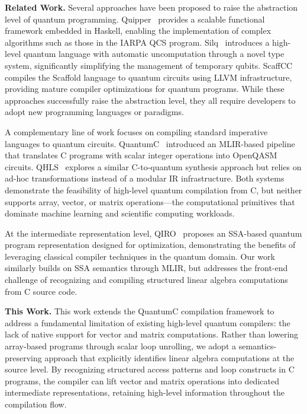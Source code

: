 \textbf{Related Work.}
Several approaches have been proposed to raise the abstraction level of quantum programming. Quipper~\cite{quipper} provides a scalable functional framework embedded in Haskell, enabling the implementation of complex algorithms such as those in the IARPA QCS program. Silq~\cite{silq} introduces a high-level quantum language with automatic uncomputation through a novel type system, significantly simplifying the management of temporary qubits. ScaffCC~\cite{scaffcc} compiles the Scaffold language to quantum circuits using LLVM infrastructure, providing mature compiler optimizations for quantum programs. While these approaches successfully raise the abstraction level, they all require developers to adopt new programming languages or paradigms.

A complementary line of work focuses on compiling standard imperative languages to quantum circuits. QuantumC~\cite{quantumc} introduced an MLIR-based pipeline that translates C programs with scalar integer operations into OpenQASM circuits. QHLS~\cite{qhls} explores a similar C-to-quantum synthesis approach but relies on ad-hoc transformations instead of a modular IR infrastructure. Both systems demonstrate the feasibility of high-level quantum compilation from C, but neither supports array, vector, or matrix operations---the computational primitives that dominate machine learning and scientific computing workloads.

At the intermediate representation level, QIRO~\cite{qiro} proposes an SSA-based quantum program representation designed for optimization, demonstrating the benefits of leveraging classical compiler techniques in the quantum domain. Our work similarly builds on SSA semantics through MLIR, but addresses the front-end challenge of recognizing and compiling structured linear algebra computations from C source code.

\textbf{This Work.} This work extends the QuantumC compilation framework to address a fundamental limitation of existing high-level quantum compilers: the lack of native support for vector and matrix computations. Rather than lowering array-based programs through scalar loop unrolling, we adopt a semantics-preserving approach that explicitly identifies linear algebra computations at the source level. By recognizing structured access patterns and loop constructs in C programs, the compiler can lift vector and matrix operations into dedicated intermediate representations, retaining high-level information throughout the compilation flow.

